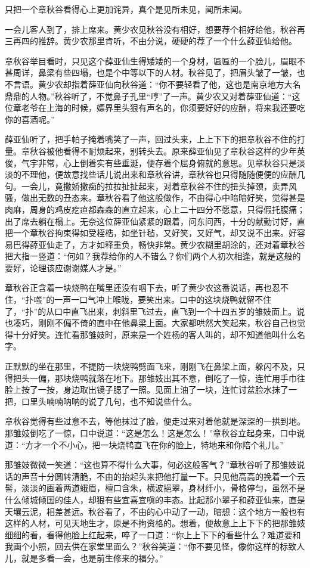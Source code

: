 \documentclass[12pt,UTF8]{ctexbook}
\begin{document}
{{{只把一个章秋谷看得心上更加诧异，真个是见所未见，闻所未闻。

一会儿客人到了，排上席来。黄少农见秋谷没有相好，想要荐个相好给他，秋谷再三再四的推辞。黄少农那里肯听，不由分说，硬硬的荐了一个什么薛亚仙给他。

章秋谷举目看时，只见这个薛亚仙生得矮矮的一个身材，匾匾的一个脸儿，眉眼不甚周详，鼻梁有些四塌，也是个中等以下的人材。秋谷见了，把眉头皱了一皱，也不言语。黄少农却指着薛亚仙向秋谷道：“你不要轻看了他，这也是南京地方大名鼎鼎的人物。”秋谷听了，不觉鼻子孔里“哼”了一声。黄少农又对着薛亚仙道：“这位章老爷在上海的时候，嫖界里头狠有声名的，你须要好好的应酬，将来我还要吃你的喜酒呢。”

薛亚仙听了，把手帕子掩着嘴笑了一声，回过头来，上上下下的把章秋谷不住的打量。章秋谷被他看得不耐烦起来，别转头去。原来薛亚仙见了章秋谷这样的少年英俊，气宇非常，心上倒着实有些垂涎，便存着个屈身俯就的意思。见章秋谷只是淡淡的不理他，便故意找些话儿说出来和章秋谷讲，章秋谷也只得随随便便的应酬几句。一会儿，竟撒娇撒痴的拉拉扯扯起来，对着章秋谷不住的扭头掉颈，卖弄风骚，做出无数的丑态来。章秋谷看了他这般做作，不由得心中暗暗好笑，觉得甚是肉麻，周身的鸡皮疙疸都森森的直立起来，心上二十四分不愿意，只得假托腹痛；出了席去躺在榻上。无奈这位薛亚仙紧紧的跟着，问东问西，十分的献勤讨好，直把一个章秋谷拘束得如受桎梏，如坐针毡，又好笑，又好气，却又说不出来。好容易巴得薛亚仙走了，方才如释重负，畅快非常。黄少农糊里胡涂的，还对着章秋谷把大指一竖道：“何如？我荐给你的人不错么？你们两个人初次相逢，就是这般的要好，论理该应谢谢媒人才是。”

章秋谷正含着一块烧鸭在嘴里还没有咽下去，听了黄少农这番说话，再也忍不住，“扑嗤”的一声一口气冲上喉咙，要笑出来。口中的这块烧鸭就留不住了，“扑”的从口中直飞出来，刺斜里飞过去，直飞到一个十四五岁的雏妓面上。说也凑巧，刚刚不偏不倚的直中在他鼻梁上面。大家都哄然大笑起来，秋谷自己也觉得十分好笑。连忙看那雏妓时，原来是一个姓杨的客人叫的，却不知道他叫什么名字。

正默默的坐在那里，不提防一块烧鸭劈面飞来，刚刚飞在鼻梁上面，躲闪不及，只得把头一偏，那块烧鸭就落在地下。那雏妓出其不意，倒吃了一惊，连忙用手巾往脸上按了一按，身边取出镜子腮了一照。见面上油了一块，连忙讨盆脸水抹了一把，口里头喃喃呐呐的说了几句，也不知说些什么。

章秋谷觉得有些过意不去，等他抹过了脸，便走过来对着他就是深深的一拱到地。那雏妓倒吃了一惊，口中说道：“这是怎么！这是怎么！”章秋谷立起身来，口中说道：“方才一个不小心，把一块烧鸭直飞在你的脸上，特地来和你陪个礼儿。”

那雏妓微微一笑道：“这也算不得什么大事，何必这般客气？”章秋谷听了那雏妓说话的声音十分圆转清脆，不由的抬起头来把他打量一下。只见他高高的挽着一个云髻，淡淡的画着两道蛾眉，檀口含朱，横波挹翠，身材纤小，骨格停匀，虽然不是什么倾城倾国的佳人，却狠有些宜喜宜嗔的丰态。比起那小翠子和薛亚仙来，直是天壤云泥，相差甚远。秋谷看了，不由的心中动了一动，暗想：这个地方一般也有这样的人材，可见天地生才，原是不拘资格的。想着，便故意上上下下的把那雏妓细细的看，看得他脸上红起来，啐了一口道：“你上上下下的看些什么？难道要和我画个小照，回去供在家堂里面么？”秋谷笑道：“你不要见怪，像你这样的标致人儿，就是多看一会，也是前生修来的福分。”

}}}
\end{document}
